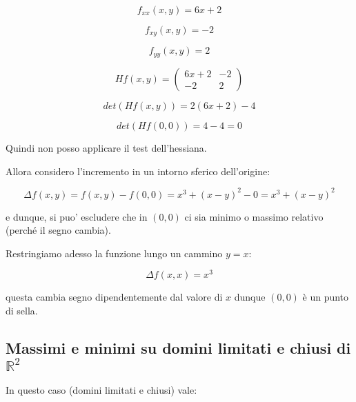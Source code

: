 \documentclass[../appunti-analisi.tex]{subfiles}
\begin{document}
\[
    f_{xx}(x,y) = 6x+2
\]

\[
    f_{xy}(x,y) = -2
\]

\[
    f_{yy}(x,y) = 2
\]

\[
    H f(x,y) = \begin{pmatrix}
        6x+2 & -2\\
        -2 & 2
    \end{pmatrix}
\]

\[
    det(H f(x,y)) = 2(6x+2) -4
\]

\[
    det(H f(0,0)) = 4-4 = 0
\]

Quindi non posso applicare il test dell'hessiana.

Allora considero l'incremento in un intorno sferico dell'origine:

\[
    \Delta f(x,y) = f(x,y) - f(0,0) = x^{3}+(x-y)^{2} -0 = x^{3}+(x-y)^{2}
\]

e dunque, si puo' escludere che in $(0,0)$ ci sia minimo o massimo relativo (perché il segno cambia).

Restringiamo adesso la funzione lungo un cammino $y=x$:

\[
    \Delta f(x,x) = x^{3}
\]

questa cambia segno dipendentemente dal valore di $x$ dunque $(0,0)$ è un punto di sella.


\subsection{Massimi e minimi su domini limitati e chiusi di $\mathbb{R}^{2}$}

In questo caso (domini limitati e chiusi) vale:

\end{document}
